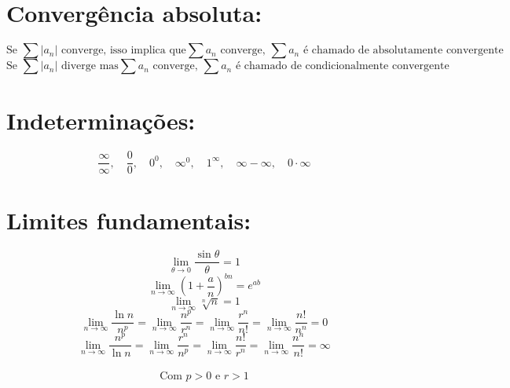 \documentclass[12pt]{article}
\begin{document}
\section{Convergência absoluta:}

\[\text{Se } \sum |a_n| \text{ converge, isso implica que} \sum a_n \text{ converge, } \sum a_n \text{ é chamado de absolutamente convergente}\]
\[\text{Se } \sum |a_n| \text{ diverge mas} \sum a_n \text{ converge, } \sum a_n \text{ é chamado de condicionalmente convergente}\]

\section{Indeterminações:}

\[\dfrac{\infty}{\infty}, \quad \dfrac{0}{0}, \quad 0^0, \quad \infty^0, \quad 1^\infty, \quad \infty-\infty, \quad 0 \cdot \infty\]

\section{Limites fundamentais:}

\[\lim_{\theta \rightarrow 0} \dfrac{\sin \theta}{\theta} = 1\]
\[\lim_{n \rightarrow \infty} \left(1 + \dfrac{a}{n}\right)^{bn} = e^{ab}\]
\[\lim_{n \rightarrow \infty} \sqrt[n]{n} = 1\]
\[\lim_{n \rightarrow \infty} \dfrac{\ln n}{n^p} = \lim_{n \rightarrow \infty} \dfrac{n^p}{r^n} = \lim_{n \rightarrow \infty} \dfrac{r^n}{n!} = \lim_{n \rightarrow \infty} \dfrac{n!}{n^n} = 0\]
\[\lim_{n \rightarrow \infty} \dfrac{n^p}{\ln n} = \lim_{n \rightarrow \infty} \dfrac{r^n}{n^p} = \lim_{n \rightarrow \infty} \dfrac{n!}{r^n} = \lim_{n \rightarrow \infty} \dfrac{n^n}{n!} = \infty\]\\
\[\text{Com } p > 0 \text{ e } r > 1\]
\end{document}
